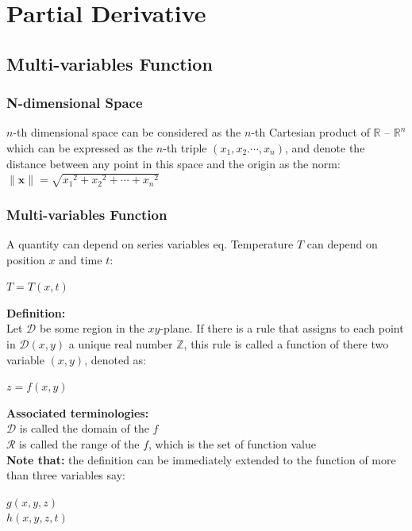 \documentclass[UTF8,a4paper, 10pt, openany]{book}
\begin{document}
\chapter{Partial Derivative}
\section{Multi-variables Function}
\subsection{N-dimensional Space}
$n$-th dimensional space can be considered as the $n$-th Cartesian product of $\mathbb{R}$ -- $\mathbb{R}^n$ which can be expressed as the $n$-th triple $(x_1,x_2.\cdots ,x_n)$, and denote the distance between any point in this space and the origin as the norm: $\|\mathbf{x}\|=\sqrt{{x_1}^2+{x_2}^2+\cdots +{x_n}^2}$
\subsection{Multi-variables Function}
A quantity can depend on series variables eq. Temperature $T$ can depend on position $x$ and time $t$:
\begin{center}
$T=T(x,t)$
\end{center}
\textbf{Definition:}\\
Let $\mathcal{D}$ be some region in the $xy$-plane. If there is a rule that assigns to each point in $\mathcal{D}(x,y)$ a unique real number $\mathbb{Z}$, this rule is called a function of there two variable $(x,y)$, denoted as:
\begin{center}
$z=f(x,y)$
\end{center}
\textbf{Associated terminologies:}\\
$\mathcal{D}$ is called the domain of the $f$\\
$\mathcal{R}$ is called the range of the $f$, which is the set of function value\\
\textbf{Note that:} the definition can be immediately extended to the function of more than three variables say:
\begin{center}
$g(x,y,z)$\\
$h(x,y,z,t)$
\end{center}
\end{document}
